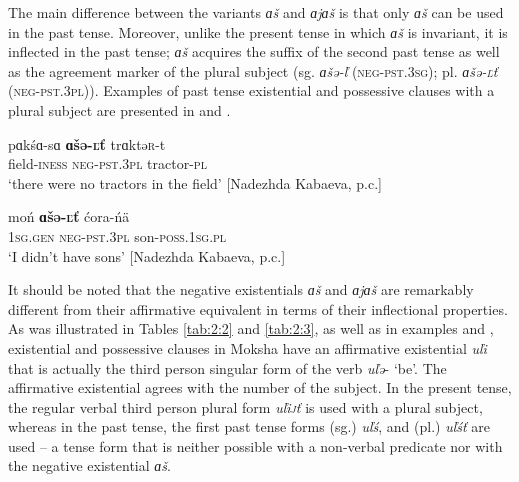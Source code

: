 \documentclass[output=paper]{langsci/langscibook}
\begin{document}
  The main difference between the variants \textit{ɑš} and \textit{ɑjɑš} is that only \textit{ɑš} can be used in the past tense. Moreover, unlike the present tense in which \textit{ɑš} is invariant, it is inflected in the past tense; \textit{ɑš} acquires the suffix of the second past tense as well as the agreement marker of the plural subject (sg. \textit{ɑšə-ľ} (\textsc{neg-pst.3sg}); pl. \textit{ɑšə-\textsc{ľ}ť} (\textsc{neg-pst.3pl)}). Examples of past tense existential and possessive clauses with a plural subject are presented in  and .

\ea\label{ex:moksha-tractor}
\gll pɑkśɑ-sɑ \textbf{ɑšə-\textsc{ľ}ť} trɑktə\textsc{r}-t\\
field-\textsc{iness}    \textsc{neg-pst.3pl}    tractor-\textsc{pl}\\
\glt `there were no tractors in the field' [Nadezhda Kabaeva, p.c.]
\z

\ea\label{ex:moksha-no-sons-pst}
\gll moń \textbf{ɑšə-\textsc{ľ}ť} ćora-ńä\\
\textsc{1sg.gen}    \textsc{neg-pst.3pl}    son-\textsc{poss.1sg.pl}\\
\glt `I didn't have sons' [Nadezhda Kabaeva, p.c.]
\z

  It should be noted that the negative existentials \textit{ɑš} and \textit{ɑjɑš} are remarkably different from their affirmative equivalent in terms of their inflectional properties. As was illustrated in Tables \ref{tab:2:2} and \ref{tab:2:3}, as well as in examples  and , existential and possessive clauses in Moksha have an affirmative existential \textit{uľi} that is actually the third person singular form of the verb \textit{uľə}- `be'. The affirmative existential agrees with the number of the subject. In the present tense, the regular verbal third person plural form \textit{uľi\textsc{j}ť} is used with a plural subject, whereas in the past tense, the first past tense forms (sg.) \textit{uľś}, and (pl.) \textit{uľśť} are used -- a tense form that is neither possible with a non-verbal predicate nor with the negative existential \textit{ɑš}.
\end{document}

